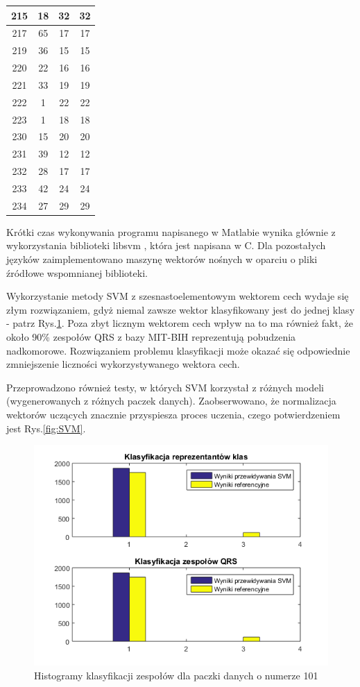 \begin{table}[!tp]
\begin{tabular}{|c|c|c|c|}
		215 & 18 & 32 & 32\\ \hline
		217 & 65 & 17 & 17\\ \hline
		219 & 36 & 15 & 15\\ \hline
		220 & 22 & 16 & 16\\ \hline	
		221 & 33 & 19 & 19\\ \hline
		222 &  1 & 22 & 22\\ \hline
		223 &  1 & 18 & 18\\ \hline
		230 & 15 & 20 & 20\\ \hline
		231 & 39 & 12 & 12\\ \hline
		232 & 28 & 17 & 17\\ \hline
		233 & 42 & 24 & 24\\ \hline
		234 & 27 & 29 & 29\\ \hline
	\end{tabular}
\end{table}

Krótki czas wykonywania programu napisanego w Matlabie wynika głównie z wykorzystania biblioteki libsvm \cite{csie}, która jest napisana w C. Dla pozostałych języków zaimplementowano maszynę wektorów nośnych w oparciu o pliki źródłowe wspomnianej biblioteki.

Wykorzystanie metody SVM z szesnastoelementowym wektorem cech wydaje się złym rozwiązaniem, gdyż niemal zawsze wektor klasyfikowany jest do jednej klasy - patrz Rys.\ref{fig:hist1}. Poza zbyt licznym wektorem cech wpływ na to ma również fakt, że około 90\% zespołów QRS z bazy MIT-BIH reprezentują pobudzenia nadkomorowe. Rozwiązaniem problemu klasyfikacji może okazać się odpowiednie zmniejszenie liczności wykorzystywanego wektora cech.

Przeprowadzono również testy, w których SVM korzystał z różnych modeli (wygenerowanych z różnych paczek danych). Zaobserwowano, że normalizacja wektorów uczących znacznie przyspiesza proces uczenia, czego potwierdzeniem jest Rys.\ref{fig:SVM}.

\begin{figure}[!htp]
	\centering
	\includegraphics[width=15cm]{Grafika/101_2_3}
	\caption{Histogramy klasyfikacji zespołów dla paczki danych o numerze 101}
	\label{fig:hist1}
\end{figure}

